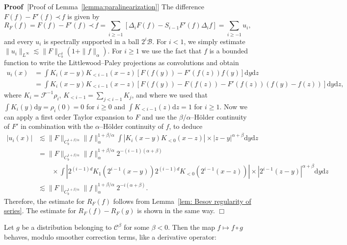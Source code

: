 \documentclass[a4paper,11pt]{article}
\newcommand{\mathd}{\mathrm{d}}
\newenvironment{proof}{\noindent\textbf{Proof\ }}{\hspace*{\fill}$\Box$\medskip}
\newcommand{\CB}{\mathscr{B}}
\newcommand{\CF}{\mathscr{F}}
\newcommand{\CC}{\mathscr{C}}
\newcommand{\lpara}{\,\mathord{\prec}\,}
\newcommand{\reso}{\,\mathord{\circ}\,}
\begin{document}
\begin{proof}[Proof of Lemma~\ref{lemma:paralinearization}]
  The difference $F (f) - F' (f) \lpara f$ is given by
  \[ R_F (f) = F (f) - F' (f) \lpara f = \sum_{i \geqslant - 1} [\Delta_i F (f)
     - S_{i - 1} F' (f) \Delta_i f] = \sum_{i \geqslant - 1} u_i, \]
  and every $u_i$ is spectrally supported in a ball $2^i \CB$. For $i < 1$, we
  simply estimate $\|u_i \|_{L^{\infty}} \lesssim \|F\|_{C^1_b}  (1
  +\|f\|_{\alpha})$. For $i \geqslant 1$ we use the fact that $f$ is a bounded
  function to write the Littlewood--Paley projections as convolutions and
  obtain
  \begin{align*}
    u_i (x) & = \int K_i  (x - y) K_{< i - 1}  (x - z)  [F (f (y)) - F' (f
    (z)) f (y)] \mathd y \mathd z\\
    & = \int K_i  (x - y) K_{< i - 1}  (x - z)  [F (f (y)) - F (f (z)) - F'
    (f (z)) (f (y) - f (z))] \mathd y \mathd z,
  \end{align*}
  where $K_i = \CF^{- 1} \rho_i$, $K_{< i - 1} = \sum_{j < i - 1} K_j$, and
  where we used that $\int K_i (y) \mathd y = \rho_i (0) = 0$ for $i \geqslant
  0$ and $\int K_{< i - 1} (z) \mathd z = 1$ for $i \geqslant 1$. Now we can
  apply a first order Taylor expansion to $F$ and use the $\beta /
  \alpha$--H{\"o}lder continuity of $F'$ in combination with the
  $\alpha$--H{\"o}lder continuity of $f$, to deduce
  \begin{align*}
    |u_i (x) | & \lesssim \|F\|_{C^{1 + \beta / \alpha}_b} \|f\|_{\alpha}^{1 +
    \beta / \alpha}  \int |K_i (x - y) K_{< 0} (x - z) | \times |z -
    y|^{\alpha + \beta} \mathd y \mathd z\\
    & = \|F\|_{C^{1 + \beta / \alpha}_b} \|f\|_{\alpha}^{1 + \beta /
    \alpha} 2^{- (i-1) (\alpha + \beta)} \\
    &\qquad \times \int |2^{(i-1)d}K_1 (2^{i-1}(x - y)) 2^{(i-1)d}K_{<0} (2^{i-1}(x - z)) | \times |2^{i-1}(z -  y)|^{\alpha + \beta} \mathd y \mathd z \\
    & \lesssim \|F\|_{C^{1 + \beta / \alpha}_b} \|f\|_{\alpha}^{1 + \beta /
    \alpha} 2^{- i (\alpha + \beta)} .
  \end{align*}
  Therefore, the estimate for $R_F (f)$ follows from Lemma~\ref{lem: Besov
  regularity of series}. The estimate for $R_F (f) - R_F (g)$ is shown in the
  same way.
\end{proof}

Let $g$ be a distribution belonging to $\CC^{\beta}$ for some $\beta < 0$.
Then the map $f \mapsto f \reso g$ behaves, modulo smoother correction terms,
like a derivative operator:
\end{document}
